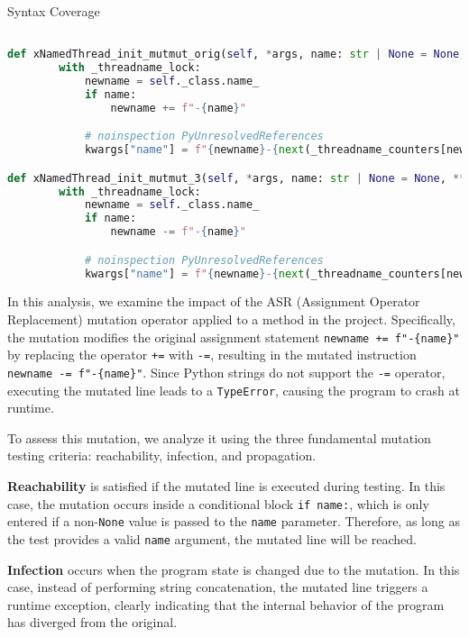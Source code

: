 \documentclass[a4paper]{scrreprt}
\newcounter{question}
\begin{document}
\begin{question}{Syntax Coverage}
\begin{enumerate}[topsep=0pt, leftmargin=*]
\begin{answer}
\begin{lstlisting}[language=Python, caption={Hypothesis-Test für \texttt{HoursMinutesSeconds\textbackslash call\_}}, label={lst:hoursminutes-call}]

def xNamedThread_init_mutmut_orig(self, *args, name: str | None = None, **kwargs):
        with _threadname_lock:
            newname = self._class.name_
            if name:
                newname += f"-{name}"

            # noinspection PyUnresolvedReferences
            kwargs["name"] = f"{newname}-{next(_threadname_counters[newname])}"

def xNamedThread_init_mutmut_3(self, *args, name: str | None = None, **kwargs):
        with _threadname_lock:
            newname = self._class.name_
            if name:
                newname -= f"-{name}"

            # noinspection PyUnresolvedReferences
            kwargs["name"] = f"{newname}-{next(_threadname_counters[newname])}"

\end{lstlisting}

In this analysis, we examine the impact of the ASR (Assignment Operator Replacement) mutation operator applied to a method in the project. Specifically, the mutation modifies the original assignment statement \texttt{newname += f"-\{name\}"} by replacing the operator \texttt{+=} with \texttt{-=}, resulting in the mutated instruction \texttt{newname -= f"-\{name\}"}. Since Python strings do not support the \texttt{-=} operator, executing the mutated line leads to a \texttt{TypeError}, causing the program to crash at runtime.

To assess this mutation, we analyze it using the three fundamental mutation testing criteria: reachability, infection, and propagation.

\textbf{Reachability} is satisfied if the mutated line is executed during testing. In this case, the mutation occurs inside a conditional block \texttt{if name:}, which is only entered if a non-\texttt{None} value is passed to the \texttt{name} parameter. Therefore, as long as the test provides a valid \texttt{name} argument, the mutated line will be reached.

\textbf{Infection} occurs when the program state is changed due to the mutation. In this case, instead of performing string concatenation, the mutated line triggers a runtime exception, clearly indicating that the internal behavior of the program has diverged from the original.


\end{answer}
\end{enumerate}
\end{question}
\end{document}

